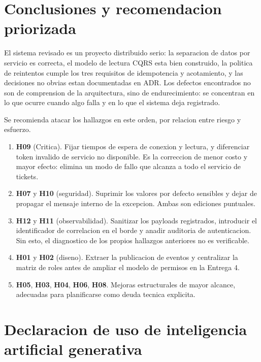 \documentclass[10pt,a4paper]{article}
\begin{document}
\section{Conclusiones y recomendacion priorizada}

El sistema revisado es un proyecto distribuido serio: la separacion de datos por servicio es
correcta, el modelo de lectura CQRS esta bien construido, la politica de reintentos cumple
los tres requisitos de idempotencia y acotamiento, y las decisiones no obvias estan
documentadas en ADR. Los defectos encontrados no son de comprension de la arquitectura, sino
de endurecimiento: se concentran en lo que ocurre cuando algo falla y en lo que el sistema
deja registrado.

Se recomienda atacar los hallazgos en este orden, por relacion entre riesgo y esfuerzo.

\begin{enumerate}[leftmargin=*]
\item \textbf{H09} (Critica). Fijar tiempos de espera de conexion y lectura, y diferenciar
token invalido de servicio no disponible. Es la correccion de menor costo y mayor efecto:
elimina un modo de fallo que alcanza a todo el servicio de tickets.
\item \textbf{H07} y \textbf{H10} (seguridad). Suprimir los valores por defecto sensibles y
dejar de propagar el mensaje interno de la excepcion. Ambas son ediciones puntuales.
\item \textbf{H12} y \textbf{H11} (observabilidad). Sanitizar los payloads registrados,
introducir el identificador de correlacion en el borde y anadir auditoria de autenticacion.
Sin esto, el diagnostico de los propios hallazgos anteriores no es verificable.
\item \textbf{H01} y \textbf{H02} (diseno). Extraer la publicacion de eventos y centralizar
la matriz de roles antes de ampliar el modelo de permisos en la Entrega 4.
\item \textbf{H05}, \textbf{H03}, \textbf{H04}, \textbf{H06}, \textbf{H08}. Mejoras
estructurales de mayor alcance, adecuadas para planificarse como deuda tecnica explicita.
\end{enumerate}

\section*{Declaracion de uso de inteligencia artificial generativa}
\end{document}
